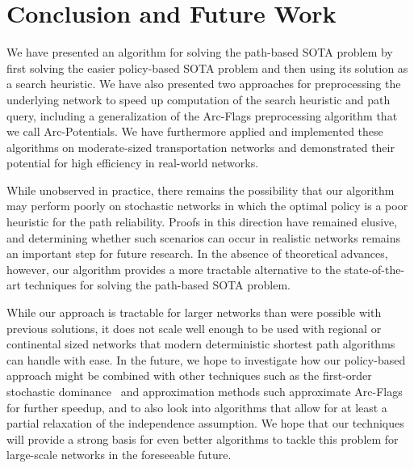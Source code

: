 \documentclass[oribibl]{llncs}
\begin{document}
	\section{Conclusion and Future Work}

		We have presented an algorithm for solving the path-based SOTA problem by first
		solving the easier policy-based SOTA problem and then using its solution as a search heuristic.
		We have also presented two approaches for preprocessing the underlying network to speed up computation of
		the search heuristic and path query,
		including a generalization of the Arc-Flags preprocessing algorithm that we call Arc-Potentials.
		We have furthermore applied and implemented these algorithms on moderate-sized transportation
		networks and demonstrated their potential for high efficiency in real-world networks.

		While unobserved in practice, there remains the possibility that our algorithm
		may perform poorly on stochastic networks
		in which the optimal policy is a poor heuristic for the path reliability.
		Proofs in this direction have remained elusive, and determining whether
		such scenarios can occur in realistic networks remains an important step for future research.
		In the absence of theoretical advances, however, our algorithm provides a more tractable
		alternative to the state-of-the-art techniques for solving the path-based SOTA problem.

		While our approach is tractable for larger
		networks than were possible with previous solutions, it does not scale well enough
		to be used with regional or continental sized networks that modern deterministic shortest
		path algorithms can handle with ease.
		In the future, we hope to investigate how our policy-based approach
		might be combined with other techniques such as
		the first-order stochastic dominance~\cite{nie2009shortest} and approximation methods such
		approximate Arc-Flags~\cite{sabran2014precomputation} for further speedup,
		and to also look into algorithms that allow for at least a partial relaxation of the
		independence assumption.
		We hope that our techniques will provide a strong basis for even better algorithms
		to tackle this problem for large-scale networks in the foreseeable future.

	
	
\end{document}
